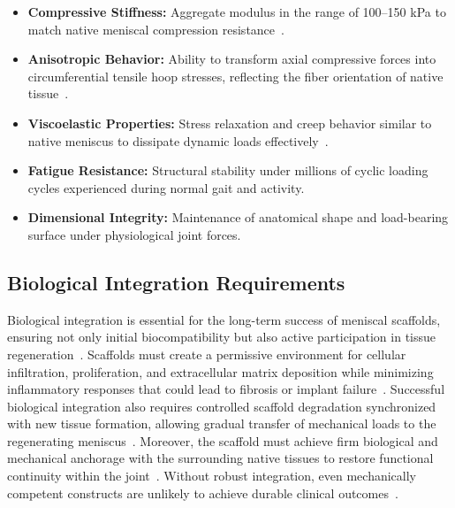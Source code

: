 \begin{itemize}
    \item \textbf{Compressive Stiffness:} Aggregate modulus in the range of 100–150 kPa to match native meniscal compression resistance~\cite{morejon2020compressiveproperties}.
    
    \item \textbf{Anisotropic Behavior:} Ability to transform axial compressive forces into circumferential tensile hoop stresses, reflecting the fiber orientation of native tissue~\cite{makris2011kneemeniscus}.
    
    \item \textbf{Viscoelastic Properties:} Stress relaxation and creep behavior similar to native meniscus to dissipate dynamic loads effectively~\cite{mordecai2014treatmentmeniscal}.
    
    \item \textbf{Fatigue Resistance:} Structural stability under millions of cyclic loading cycles experienced during normal gait and activity.
    
    \item \textbf{Dimensional Integrity:} Maintenance of anatomical shape and load-bearing surface under physiological joint forces.
\end{itemize}

\subsection{Biological Integration Requirements}

Biological integration is essential for the long-term success of meniscal scaffolds, ensuring not only initial biocompatibility but also active participation in tissue regeneration~\cite{ma2025structurallysophisticated, li20213dprinted, li2024advancedhydrogel, luis20203ddirect, shamloo2018acceleratedfullthickness}.
Scaffolds must create a permissive environment for cellular infiltration, proliferation, and extracellular matrix deposition while minimizing inflammatory responses that could lead to fibrosis or implant failure~\cite{shamloo2018acceleratedfullthickness, xu2013hybridprinting}. Successful biological integration also requires controlled scaffold degradation synchronized with new tissue formation, allowing gradual transfer of mechanical loads to the regenerating meniscus~\cite{morenonieto2021productdesign, pitt1981aliphaticpolyesters}. Moreover, the scaffold must achieve firm biological and mechanical anchorage with the surrounding native tissues to restore functional continuity within the joint~\cite{ghodbane2019partialmeniscus}. Without robust integration, even mechanically competent constructs are unlikely to achieve durable clinical outcomes~\cite{bakerengineeringanatomicallyshaped}.

